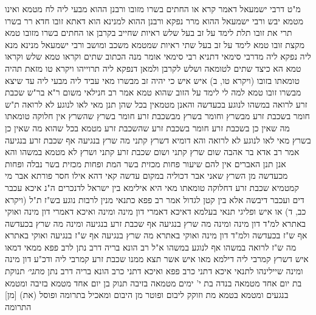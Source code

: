 \documentclass[12pt, openany]{book}
\begin{document}
{מ"ט דרבי ישמעאל דאמר קרא או החתים בשרו מזובו 
ורבנן ההוא מבעי ליה לח מטמא ואינו מטמא יבש 
ורבי ישמעאל ההוא מרר נפקא 
ורבנן ההוא למנינא הוא דאתא זובו חדא רר בשרו תרי את זובו תלת לימד על זב בעל שלש ראיות שחייב בקרבן 
או החתים בשרו מזובו טמא מקצת זובו טמא לימד על זב בעל שתי ראיות שמטמא משכב ומושב ורבי ישמעאל מנינא מנא ליה נפקא ליה מדרבי סימאי
דתניא רבי סימאי אומר מנה הכתוב שתים וקראו טמא שלש וקראו טמא הא כיצד שתים לטומאה ושלש לקרבן 
ולמאן דנפקא ליה תרוייהו {ויקרא טו } מזאת תהיה טומאתו בזובו (ויקרא טו, ב) איש איש כי יהיה זב מבשרו מאי עביד ליה מבעי ליה עד שיצא מבשרו 
זובו טמא למה לי לימד על הזוב שהוא טמא 
אמר רב חנילאי משום ר"א בר"ש שכבת זרע לרואה במשהו לנוגע בכעדשה והאנן מטמאין בכל שהן תנן מאי לאו לנוגע לא לרואה 
ת"ש חומר בשכבת זרע מבשרץ וחומר בשרץ מבשכבת זרע חומר בשרץ שהשרץ אין חלוקה טומאתו מה שאין כן בשכבת זרע חומר בשכבת זרע שהשכבת זרע מטמא בכל שהוא מה שאין כן בשרץ 
מאי לאו לנוגע  לא לרואה 
והא דומיא דשרץ קתני מה שרץ בנגיעה אף שכבת זרע בנגיעה אמר רב אדא בר אהבה שום שרץ קתני ושום שכבת זרע קתני 
ושרץ לא מטמא במשהו והא אנן תנן האברים אין להם שיעור פחות מכזית בשר המת ופחות מכזית בשר נבלה ופחות מכעדשה מן השרץ 
שאני אבר דכוליה במקום עדשה קאי דהא אילו חסר פורתא אבר מי קמטמיא 
שכבת זרע דחלוקה טומאתו מאי היא אילימא בין ישראל לדנכרים ה"נ איכא עכבר דים ועכבר דיבשה 
אלא בין קטן לגדול 
אמר רב פפא כתנאי מנין לרבות נוגע בש"ז ת"ל (ויקרא כב, ד) או איש 
ופליגי תנאי בעלמא דאיכא דאמרי דון מינה ומינה ואיכא דאמרי דון מינה ואוקי באתרא 
למ"ד דון מינה ומינה מה שרץ בנגיעה אף שכבת זרע בנגיעה ומינה מה שרץ בכעדשה אף ש"ז בכעדשה 
ולמ"ד דון מינה ואוקי באתרא מה שרץ בנגיעה אף ש"ז בנגיעה ואוקי באתרא מה ש"ז לרואה במשהו אף לנוגע במשהו 
א"ל רב הונא בריה דרב נתן לרב פפא ממאי דמאו איש דשרץ קמרבי ליה דילמא מאו איש אשר תצא ממנו שכבת זרע קמרבי ליה ודכ"ע דון מינה ומינה 
שיילינהו לתנאי איכא דתני כרב פפא ואיכא דתני כרב הונא בריה דרב נתן
{\large\emph{מתני׳}} תנוקת בת יום אחד מטמאה בנדה בת י' ימים מטמאה בזיבה
תנוק בן יום אחד מטמא בזיבה ומטמא בנגעים ומטמא בטמא מת וזוקק ליבום ופוטר מן היבום ומאכיל בתרומה ופוסל (את) [מן] התרומה}
\end{document}
